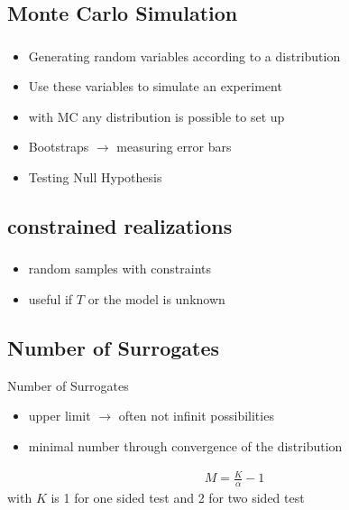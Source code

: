 \subsection{Monte Carlo Simulation}
\begin{frame}
  \frametitle{\insertsectionhead}
  \framesubtitle{\insertsubsectionhead}
\begin{itemize}
  \item Generating random variables according to a distribution
  \item Use these variables to simulate an experiment 
  \item with MC any distribution is possible to set up
  \item Bootstraps $\rightarrow$ measuring error bars 
  \item Testing Null Hypothesis
\end{itemize}
\end{frame}


\subsection{constrained realizations}
\begin{frame}
  \frametitle{\insertsectionhead}
  \framesubtitle{\insertsubsectionhead}
\begin{itemize}
  \item random samples with constraints
  \item useful if $T$ or the model is unknown 
\end{itemize}
\subsection{Number of Surrogates}
Number of Surrogates
\begin{itemize}
  \item upper limit $\rightarrow$ often not infinit possibilities
  \item minimal number through convergence of the distribution
\end{itemize}
\begin{gather}
  M = \frac{K}{\alpha}-1
\end{gather}
with $K$ is 1 for one sided test and 2 for two sided test \cite{LANCASTER20181}
\end{frame}

